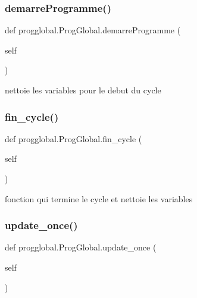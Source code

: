 \subsubsection{\texorpdfstring{demarre\+Programme()}{demarreProgramme()}}
{\footnotesize\ttfamily def progglobal.\+Prog\+Global.\+demarre\+Programme (\begin{DoxyParamCaption}\item[{}]{self }\end{DoxyParamCaption})}



nettoie les variables pour le debut du cycle 

\mbox{\label{classprogglobal_1_1_prog_global_aee583a06f39c3607557f3138fcbd1244}} 
\subsubsection{\texorpdfstring{fin\+\_\+cycle()}{fin\_cycle()}}
{\footnotesize\ttfamily def progglobal.\+Prog\+Global.\+fin\+\_\+cycle (\begin{DoxyParamCaption}\item[{}]{self }\end{DoxyParamCaption})}



fonction qui termine le cycle et nettoie les variables 

\mbox{\label{classprogglobal_1_1_prog_global_ab3221f96c5601f1d4e12baf474fb7079}} 
\subsubsection{\texorpdfstring{update\+\_\+once()}{update\_once()}}
{\footnotesize\ttfamily def progglobal.\+Prog\+Global.\+update\+\_\+once (\begin{DoxyParamCaption}\item[{}]{self }\end{DoxyParamCaption})}



